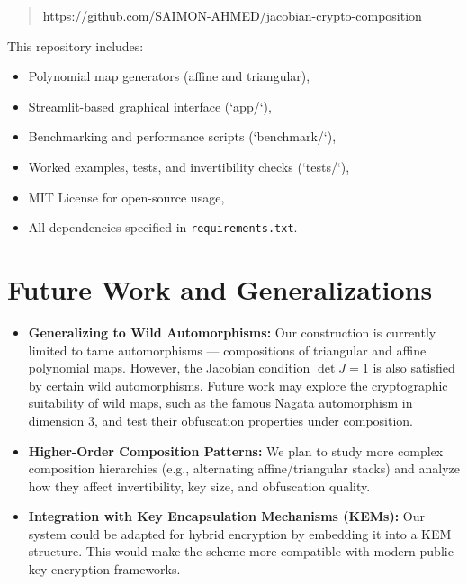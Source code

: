 \documentclass[12pt]{article}
\begin{document}
\begin{quote}
\url{https://github.com/SAIMON-AHMED/jacobian-crypto-composition}

\end{quote}

This repository includes:
\begin{itemize}
    \item Polynomial map generators (affine and triangular),
    \item Streamlit-based graphical interface (`app/`),
    \item Benchmarking and performance scripts (`benchmark/`),
    \item Worked examples, tests, and invertibility checks (`tests/`),
    \item MIT License for open-source usage,
    \item All dependencies specified in \texttt{requirements.txt}.
\end{itemize}




\section{Future Work and Generalizations}

\begin{itemize}
    \item \textbf{Generalizing to Wild Automorphisms:}  
    Our construction is currently limited to tame automorphisms — compositions of triangular and affine polynomial maps. However, the Jacobian condition \( \det J = 1 \) is also satisfied by certain wild automorphisms. Future work may explore the cryptographic suitability of wild maps, such as the famous Nagata automorphism in dimension 3, and test their obfuscation properties under composition.

    \item \textbf{Higher-Order Composition Patterns:}  
    We plan to study more complex composition hierarchies (e.g., alternating affine/triangular stacks) and analyze how they affect invertibility, key size, and obfuscation quality.

    \item \textbf{Integration with Key Encapsulation Mechanisms (KEMs):}  
    Our system could be adapted for hybrid encryption by embedding it into a KEM structure. This would make the scheme more compatible with modern public-key encryption frameworks.
\end{itemize}
\end{document}
